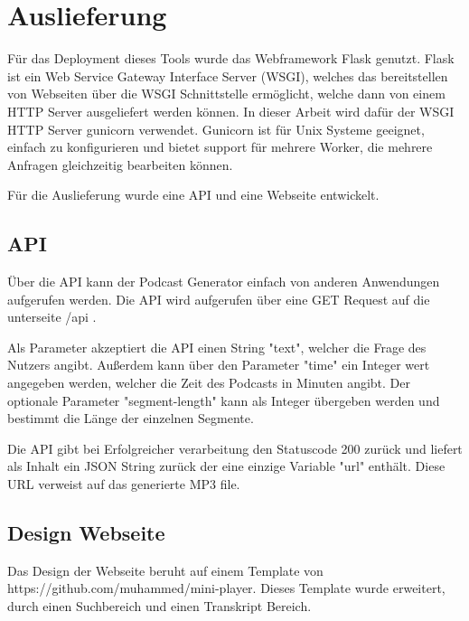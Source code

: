 \section{Auslieferung}

Für das Deployment dieses Tools wurde das Webframework Flask genutzt.
Flask ist ein Web Service Gateway Interface Server (WSGI), welches das bereitstellen von Webseiten über die WSGI Schnittstelle ermöglicht, welche dann von einem HTTP Server ausgeliefert werden können.
In dieser Arbeit wird dafür der WSGI HTTP Server gunicorn verwendet.
Gunicorn ist für Unix Systeme geeignet, einfach zu konfigurieren und bietet support für mehrere Worker, die mehrere Anfragen gleichzeitig bearbeiten können.

Für die Auslieferung wurde eine API und eine Webseite entwickelt.

\subsection{API}

Über die API kann der Podcast Generator einfach von anderen Anwendungen aufgerufen werden.
Die API wird aufgerufen über eine GET Request auf die unterseite /api .

Als Parameter akzeptiert die API einen String "text", welcher die Frage des Nutzers angibt.
Außerdem kann über den Parameter "time" ein Integer wert angegeben werden, welcher die Zeit des Podcasts in Minuten angibt.
Der optionale Parameter "segment-length" kann als Integer übergeben werden und bestimmt die Länge der einzelnen Segmente.

Die API gibt bei Erfolgreicher verarbeitung den Statuscode 200 zurück und liefert als Inhalt ein JSON String zurück der eine einzige Variable "url" enthält.
Diese URL verweist auf das generierte MP3 file.

\subsection{Design Webseite}

Das Design der Webseite beruht auf einem Template von https://github.com/muhammed/mini-player.
Dieses Template wurde erweitert, durch einen Suchbereich und einen Transkript Bereich.



